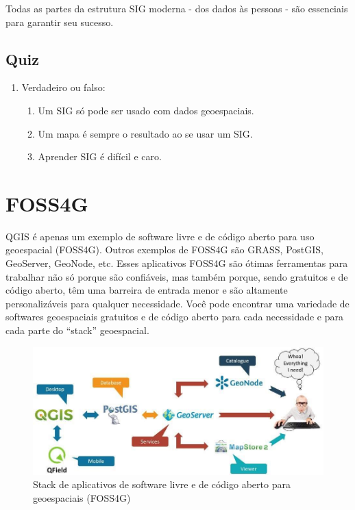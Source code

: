 \documentclass[
]{krantz}
\providecommand{\tightlist}{%
  \setlength{\itemsep}{0pt}\setlength{\parskip}{0pt}}
\begin{document}
Todas as partes da estrutura SIG moderna - dos dados às pessoas - são essenciais para garantir seu sucesso.

\hypertarget{quiz-2}{%
\subsection{Quiz}\label{quiz-2}}

\begin{enumerate}
\def\labelenumi{\arabic{enumi}.}
\tightlist
\item
  Verdadeiro ou falso:

  \begin{enumerate}
  \def\labelenumii{\arabic{enumii}.}
  \tightlist
  \item
    Um SIG só pode ser usado com dados geoespaciais.
  \item
    Um mapa é sempre o resultado ao se usar um SIG.
  \item
    Aprender SIG é difícil e caro.
  \end{enumerate}
\end{enumerate}

\hypertarget{foss4g}{%
\section{FOSS4G}\label{foss4g}}

QGIS é apenas um exemplo de software livre e de código aberto para uso geoespacial (FOSS4G). Outros exemplos de FOSS4G são GRASS, PostGIS, GeoServer, GeoNode, etc. Esses aplicativos FOSS4G são ótimas ferramentas para trabalhar não só porque são confiáveis, mas também porque, sendo gratuitos e de código aberto, têm uma barreira de entrada menor e são altamente personalizáveis para qualquer necessidade. Você pode encontrar uma variedade de softwares geoespaciais gratuitos e de código aberto para cada necessidade e para cada parte do ``stack'' geoespacial.

\begin{figure}
\centering
\includegraphics{media/modulo0/foss4g-stack.jpeg}
\caption{Stack de aplicativos de software livre e de código aberto para geoespaciais (FOSS4G)}
\end{figure}
\end{document}
